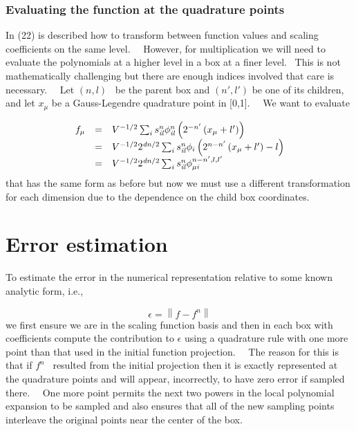 \documentclass[letterpaper]{book}
\begin{document}
\subsubsection[Evaluating the function at the quadrature points]{\rmfamily Evaluating the function at the quadrature
points}
In (22) is described how to transform between function values and scaling coefficients on the same level. \ \ However,
for multiplication we will need to evaluate the polynomials at a higher level in a box at a finer level. \ This is not
mathematically challenging but there are enough indices involved that care is necessary. \ \ Let  $(n,l)$ \ be the
parent box and  $(n',l')$ be one of its children, and let  $x_{\mu }$ be a Gauss-Legendre quadrature point in [0,1].
\ \ We want to evaluate 

\begin{equation}\label{seq:refText43}
\begin{matrix}f_{\mu }&\text{=}&V^{-1/2}\sum _{i}{s_{\mathit{il}}^{n}\phi _{\mathit{il}}^{n}\left(2^{-n'}\left(x_{\mu
}+l'\right)\right)}\hfill\null \\&\text{=}&V^{-1/2}2^{\mathit{dn}/2}\sum _{i}{s_{\mathit{il}}^{n}\phi
_{i}\left(2^{n-n'}\left(x_{\mu }+l'\right)-l\right)}\hfill\null \\&\text{=}&V^{-1/2}2^{\mathit{dn}/2}\sum
_{i}{s_{\mathit{il}}^{n}\phi _{\mu i}^{n-n',l,l'}}\hfill\null \end{matrix}
\end{equation}
that has the same form as before but now we must use a different transformation for each dimension due to the dependence
on the child box coordinates.

\section{Error estimation}
To estimate the error in the numerical representation relative to some known analytic form, i.e., 

\begin{equation}
\epsilon =\left\|f-f^{n}\right\|
\end{equation}
we first ensure we are in the scaling function basis and then in each box with coefficients compute the contribution to 
$\epsilon $ using a quadrature rule with one more point than that used in the initial function projection. \ \ The
reason for this is that if  $f^{n}$ \ resulted from the initial projection then it is exactly represented at the
quadrature points and will appear, incorrectly, to have zero error if sampled there. \ \ One more point permits the
next two powers in the local polynomial expansion to be sampled and also ensures that all of the new sampling points
interleave the original points near the center of the box. \ 
\end{document}

